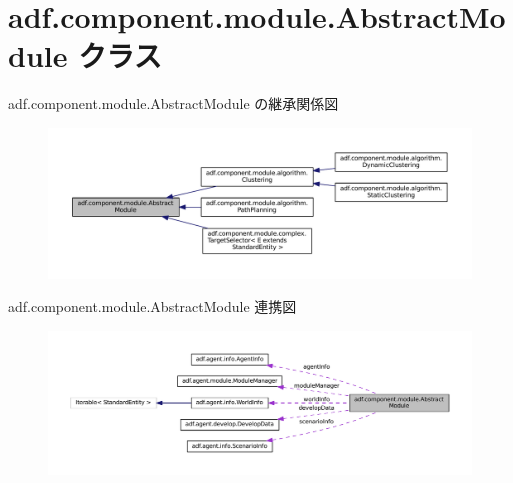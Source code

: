 \hypertarget{classadf_1_1component_1_1module_1_1AbstractModule}{}\section{adf.\+component.\+module.\+Abstract\+Module クラス}
\label{classadf_1_1component_1_1module_1_1AbstractModule}


adf.\+component.\+module.\+Abstract\+Module の継承関係図
\nopagebreak
\begin{figure}[H]
\begin{center}
\leavevmode
\includegraphics[width=350pt]{classadf_1_1component_1_1module_1_1AbstractModule__inherit__graph}
\end{center}
\end{figure}


adf.\+component.\+module.\+Abstract\+Module 連携図
\nopagebreak
\begin{figure}[H]
\begin{center}
\leavevmode
\includegraphics[width=350pt]{classadf_1_1component_1_1module_1_1AbstractModule__coll__graph}
\end{center}
\end{figure}

